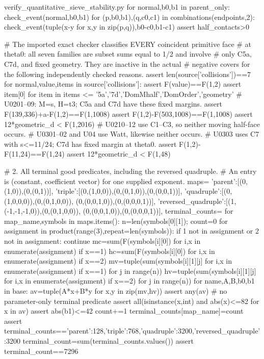 \begin{filecontents*}[overwrite]{verify_quantitative_sieve_stability.py}
for normal,b0,b1 in parent_only:
    check_event(normal,b0,b1)
for (p,b0,b1),(q,c0,c1) in combinations(endpoints,2):
    check_event(tuple(x-y for x,y in zip(p,q)),b0-c0,b1-c1)
assert half_contacts>0

# The imported exact checker classifies EVERY coincident primitive face
# at theta0: all seven families are subset sums equal to 1/2 and involve
# only C5a, C7d, and fixed geometry.  They are inactive in the actual
# negative covers for the following independently checked reasons.
assert len(source['collisions'])==7
for normal,value,items in source['collisions']:
    assert F(value)==F(1,2)
    assert {item[0] for item in items} <= {'5a','7d','DomMhalf','DomOrder','geometry'}
# U0201--09: M=s, H=t3; C5a and C7d have these fixed margins.
assert F(139,336)+a-F(1,2)==F(1,1008)
assert F(1,2)-F(503,1008)==F(1,1008)
assert 12*geometric_d < F(1,2016)
# U0210--12 use C1--C3, so neither moving half-face occurs.
# U0301--02 and U04 use Watt, likewise neither occurs.
# U0303 uses C7 with s<=11/24; C7d has fixed margin at theta0.
assert F(1,2)-F(11,24)==F(1,24)
assert 12*geometric_d < F(1,48)

# 2. All terminal good predicates, including the reversed quadruple.
# An entry is (constant, coefficient vector) for one supplied exponent.
maps={
 'parent':[(0,(1,0)),(0,(0,1))],
 'triple':[(0,(1,0,0)),(0,(0,1,0)),(0,(0,0,1))],
 'quadruple':[(0,(1,0,0,0)),(0,(0,1,0,0)),
              (0,(0,0,1,0)),(0,(0,0,0,1))],
 'reversed_quadruple':[(1,(-1,-1,-1,0)),(0,(0,1,0,0)),
                       (0,(0,0,1,0)),(0,(0,0,0,1))],
}
terminal_counts={}
for map_name,symbols in maps.items():
    n=len(symbols[0][1]); count=0
    for assignment in product(range(3),repeat=len(symbols)):
        if 1 not in assignment or 2 not in assignment: continue
        mc=sum(F(symbols[i][0]) for i,x in enumerate(assignment) if x==1)
        hc=sum(F(symbols[i][0]) for i,x in enumerate(assignment) if x==2)
        mv=tuple(sum(symbols[i][1][j] for i,x in enumerate(assignment) if x==1) for j in range(n))
        hv=tuple(sum(symbols[i][1][j] for i,x in enumerate(assignment) if x==2) for j in range(n))
        for name,A,B,b0,b1 in base:
            av=tuple(A*x+B*y for x,y in zip(mv,hv))
            assert any(av)  # no parameter-only terminal predicate
            assert all(isinstance(x,int) and abs(x)<=82 for x in av)
            assert abs(b1)<=42
            count+=1
    terminal_counts[map_name]=count
assert terminal_counts=={'parent':128,'triple':768,'quadruple':3200,'reversed_quadruple':3200}
terminal_count=sum(terminal_counts.values())
assert terminal_count==7296


\end{filecontents*}
